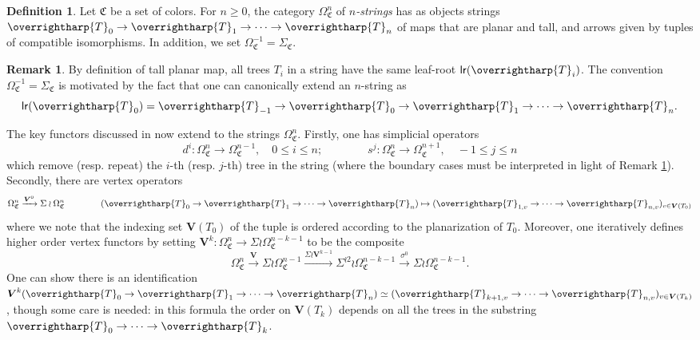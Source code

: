 \documentclass[a4paper,10pt
,draft
]{article}%
\numberwithin{equation}{section}
\numberwithin{figure}{section}
\theoremstyle{definition} %
\newtheorem{definition}[equation]{Definition}%
\newtheorem{remark}[equation]{Remark}%
\newcommand{\vect}[1]{\text{\overrightharp{\ensuremath{#1}}}}
\newcommand{\1}{\ensuremath{\mathbbm 1}}%
\begin{document}
\begin{definition}
Let $\mathfrak{C}$ be a set of colors.
For $n \geq 0$, the category $\Omega_{\mathfrak{C}}^n$ of \textit{$n$-strings} has as objects strings $\vect{T}_0 \to \vect{T}_1 \to \cdots \to \vect{T}_n$ of maps that are planar and tall, and arrows given by tuples of compatible isomorphisms.
In addition, we set $\Omega^{-1}_{\mathfrak{C}} = \Sigma_{\mathfrak{C}}$.
\end{definition}


\begin{remark}\label{ADDCOROL REM}
	By definition of tall planar map, 
	all trees $T_i$ in a string have the same leaf-root
	$\mathsf{lr}(\vect{T}_i)$. The convention $\Omega^{-1}_{\mathfrak{C}} = \Sigma_{\mathfrak{C}}$ 
	is motivated by the fact that one can 
	canonically extend an $n$-string as
	\[\mathsf{lr}(\vect{T}_0)=\vect{T}_{-1} \to \vect{T}_0 \to \vect{T}_1 \to \cdots \to \vect{T}_n.\]
\end{remark}




The key functors discussed in \cite[\S 3.4]{BP_geo} now extend to the strings
$\Omega_{\mathfrak{C}}^n$.
Firstly, one has simplicial operators
\[
d^i \colon \Omega_{\mathfrak{C}}^n \to \Omega_{\mathfrak{C}}^{n-1},
\quad 0 \leq i \leq n;
\qquad \qquad
s^j \colon \Omega_{\mathfrak{C}}^{n} \to \Omega_{\mathfrak{C}}^{n+1},
\quad -1 \leq j \leq n
\]
which remove (resp. repeat) the $i$-th (resp. $j$-th) tree in the string (where the boundary cases must be interpreted in light of 
Remark \ref{ADDCOROL REM}).
Secondly, there are vertex operators
\[
\Omega^{n}_{\mathfrak{C}}
\xrightarrow{\boldsymbol{V}^0}
\Sigma \wr \Omega^{n}_{\mathfrak{C}}
\qquad \qquad
(\vect{T}_0 \to \vect{T}_1 \to \cdots \to \vect{T}_n)
\mapsto
(\vect{T}_{1,v} \to \cdots \to \vect{T}_{n,v})_{v \in \boldsymbol{V}(T_0)}
\]
where we note that the indexing set 
$\boldsymbol{V}(T_0)$ of the tuple
is ordered according to the planarization of $T_0$.
Moreover, one iteratively defines higher order vertex functors
by setting 
$\boldsymbol{V}^{k}\colon \Omega^{n}_{\mathfrak{C}}
\to \Sigma \wr \Omega^{n-k-1}_{\mathfrak{C}}$
to be the composite
\begin{equation}\label{VKDEF EQ}
\Omega^{n}_{\mathfrak{C}}
\xrightarrow{\boldsymbol{V}}
\Sigma \wr\Omega^{n-1}_{\mathfrak{C}}
\xrightarrow{\Sigma \wr \boldsymbol{V}^{k-1}}
\Sigma^{\wr 2} \wr \Omega^{n-k-1}_{\mathfrak{C}}
\xrightarrow{\sigma^0}
\Sigma \wr \Omega^{n-k-1}_{\mathfrak{C}}.
\end{equation}
One can show there is an identification
$\boldsymbol{V}^k(\vect{T}_0 \to \vect{T}_1 \to \cdots \to \vect{T}_n)
\simeq (\vect{T}_{k+1,v} \to \cdots \to \vect{T}_{n,v})_{v \in \boldsymbol{V}(T_k)}$, though some care is needed:
in this formula the order on $\boldsymbol{V}(T_k)$
depends on all the trees in the substring
$\vect{T}_0 \to \cdots \to \vect{T}_k$.
\end{document}
